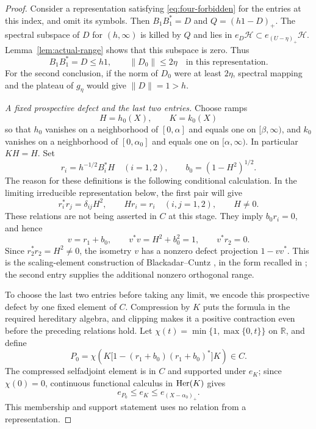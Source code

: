\begin{proof}
Consider a representation satisfying
\eqref{eq:four-forbidden} for the entries at this index, and
omit its symbols.  Then \(B_1B_1^*=D\) and
\(Q=(h1-D)_+\).  The spectral subspace of \(D\) for
\((h,\infty)\) is killed by \(Q\) and lies in
\(e_D\mathcal H\subset e_{(U-\eta)_+}\mathcal H\).
Lemma~\ref{lem:actual-range} shows that this subspace is zero.
Thus
\begin{equation}\label{eq:four-first-bounds}
 B_1B_1^*=D\le h1,\qquad \|D_0\|\le2\eta
 \quad\text{in this representation}.
\end{equation}
For the second conclusion, if the norm of \(D_0\) were at
least \(2\eta\), spectral mapping and the plateau of \(g_\eta\)
would give \(\|D\|=1>h\).

\medskip\noindent\emph{A fixed prospective defect and the last two entries.}
Choose ramps
\[
 H=h_0(X),\qquad K=k_0(X)
\]
so that \(h_0\) vanishes on a neighborhood of
\([0,\alpha]\) and equals one on \([\beta,\infty)\), and
\(k_0\) vanishes on a neighborhood of \([0,\alpha_0]\) and
equals one on \([\alpha,\infty)\).  In particular \(KH=H\).
Set
\begin{equation}\label{eq:four-r}
 r_i=h^{-1/2}B_i^*H\quad(i=1,2),\qquad
 b_0=(1-H^2)^{1/2}.
\end{equation}
The reason for these definitions is the following conditional
calculation.  In the limiting irreducible representation below, the
first pair will give
\[
 r_i^*r_j=\delta_{ij}H^2,\qquad Hr_i=r_i\quad(i,j=1,2),
 \qquad H\ne0.
\]
These relations are not being asserted in \(C\) at this stage.
They imply \(b_0r_i=0\), and hence
\[
 v=r_1+b_0,\qquad v^*v=H^2+b_0^2=1,\qquad v^*r_2=0.
\]
Since \(r_2^*r_2=H^2\ne0\), the isometry \(v\) has a nonzero
defect projection \(1-vv^*\).  This is the scaling-element
construction of Blackadar--Cuntz \cite{BlackadarCuntz1982}, in the
form recalled in \cite[Remark~2.4]{PasnicuRordam2007}; the second
entry supplies the additional nonzero orthogonal range.

To choose the last two entries before taking any limit, we encode
this prospective defect by one fixed element of \(C\).  Compression
by \(K\) puts the formula in the required hereditary algebra, and
clipping makes it a positive contraction even before the preceding
relations hold.  Let
\(\chi(t)=\min\{1,\max\{0,t\}\}\) on \(\mathbb R\), and define
\begin{equation}\label{eq:four-P0}
 P_0=\chi\!\left(
 K\bigl[1-(r_1+b_0)(r_1+b_0)^*\bigr]K
 \right)\in C.
\end{equation}
The compressed selfadjoint element is in \(C\) and supported
under \(e_K\); since \(\chi(0)=0\), continuous functional
calculus in \(\operatorname{Her}(K)\) gives
\[
 e_{P_0}\le e_K\le e_{(X-\alpha_0)_+}.
\]
This membership and support statement uses no relation from a
representation.


\end{proof}
